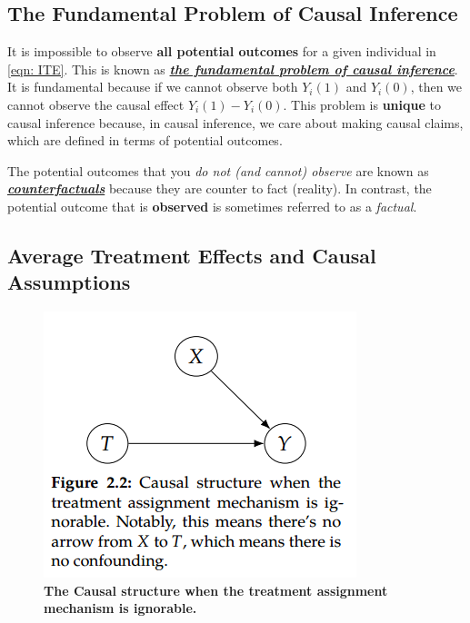 \documentclass[11pt]{article}
\begin{document}
\subsection{The Fundamental Problem of Causal Inference}
It is impossible to observe \textbf{all potential outcomes} for a given individual in \eqref{eqn: ITE}. This is known as \underline{\emph{\textbf{the fundamental problem of causal inference}}}. It is fundamental because if we cannot observe both $Y_i(1)$ and $Y_i(0)$, then we cannot observe the causal effect $Y_i(1) - Y_i(0)$. This problem is \textbf{unique} to causal inference because, in causal inference, we care about making causal claims, which are defined in terms of potential outcomes. 

The potential outcomes that you \emph{do not (and cannot) observe} are known as \underline{\emph{\textbf{counterfactuals}}} because they are counter to fact (reality). In contrast, the potential outcome that is \textbf{observed} is sometimes referred to as a \emph{factual}. 

\subsection{Average Treatment Effects and Causal Assumptions}
\begin{figure}
\begin{minipage}[t]{1\linewidth}
  \centering
  \centerline{\includegraphics[scale = 0.5]{ignorability.png}}
\end{minipage}
\caption{\footnotesize{\textbf{The Causal structure when the
treatment assignment mechanism is ignorable.  \citep{neal2020introduction}}}}
\label{fig: ignorability}
\end{figure}
\end{document}
